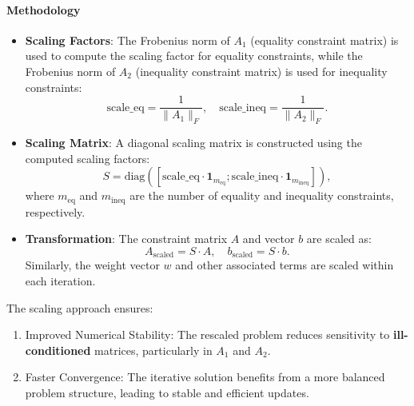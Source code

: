 \documentclass{article}
\begin{document}
\paragraph{Methodology}
\begin{itemize}
    \item \textbf{Scaling Factors}: 
    The Frobenius norm of $A_1$ (equality constraint matrix) is used to compute the scaling factor for equality constraints, while the Frobenius norm of $A_2$ (inequality constraint matrix) is used for inequality constraints:
    \[
    \text{scale\_eq} = \frac{1}{\|A_1\|_F}, \quad \text{scale\_ineq} = \frac{1}{\|A_2\|_F}.
    \]

    \item \textbf{Scaling Matrix}: 
    A diagonal scaling matrix is constructed using the computed scaling factors:
    \[
    S = \text{diag}([\text{scale\_eq} \cdot \mathbf{1}_{m_{\text{eq}}}; \text{scale\_ineq} \cdot \mathbf{1}_{m_{\text{ineq}}}]),
    \]
    where $m_{\text{eq}}$ and $m_{\text{ineq}}$ are the number of equality and inequality constraints, respectively.

    \item \textbf{Transformation}:
    The constraint matrix $A$ and vector $b$ are scaled as:
    \[
    A_{\text{scaled}} = S \cdot A, \quad b_{\text{scaled}} = S \cdot b.
    \]
    Similarly, the weight vector $w$ and other associated terms are scaled within each iteration.
\end{itemize}

The scaling approach ensures:
\begin{enumerate}
    \item Improved Numerical Stability: The rescaled problem reduces sensitivity to \textbf{ill-conditioned} matrices, particularly in $A_1$ and $A_2$.
    \item Faster Convergence: The iterative solution benefits from a more balanced problem structure, leading to stable and efficient updates.
\end{enumerate}

\end{document}
